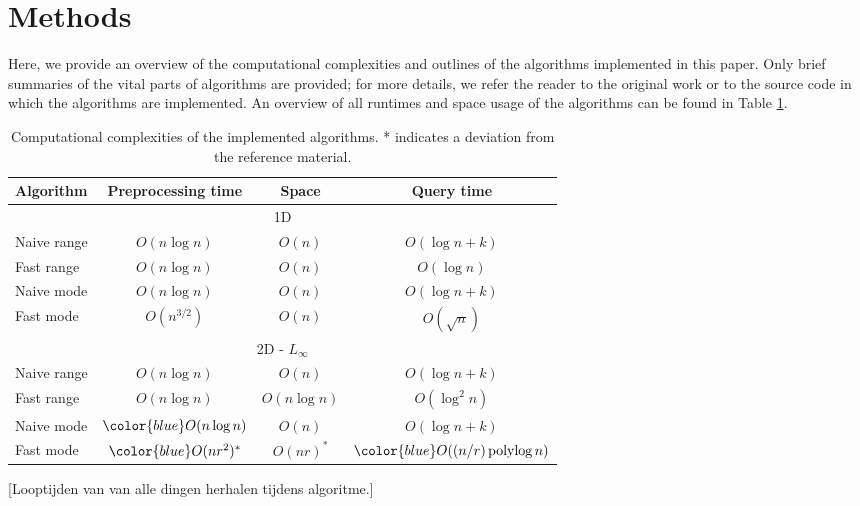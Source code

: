 \documentclass{article}
\newcommand{\todo}[1]{{\color{red}[#1]}}
\newcommand{\fb}[1]{{\color{blue}#1}}
\DeclareMathOperator{\polylog}{polylog}
\begin{document}
\section{Methods}
Here, we provide an overview of the computational complexities and outlines of
the algorithms implemented in this paper. Only brief summaries of the vital
parts of algorithms are provided; for more details, we refer the reader to the
original work or to the source code in which the algorithms are implemented. An
overview of all runtimes and space usage of the algorithms can be found in
Table \ref{tab:runtimes}.
\begin{table}[h]
    \centering
    \begin{tabular}{|l|ccc|}
        \hline
        Algorithm   & Preprocessing time & Space         & Query time                 \\
        \hline
        \hline
        \multicolumn{4}{|c|}{1D}                                                      \\
        \hline
        Naive range & $O(n \log n)$      & $O(n)$        & $O(\log n + k)$            \\
        Fast range  & $O(n \log n)$      & $O(n)$        & $O(\log n)$                \\
        Naive mode  & \fb{$O(n \log n)$} & \fb{$O(n)$}   & \fb{$O(\log n + k)$}       \\
        Fast mode   & $O(n^{3/2})$       & $O(n)$        & $O(\sqrt{n})$              \\
        \hline
        \multicolumn{4}{|c|}{2D - $L_\infty$}                                         \\
        \hline
        Naive range & $O(n \log n)$      & $O(n)$        & $O(\log n + k)$            \\
        Fast range  & $O(n \log n)$      & $O(n \log n)$ & $O(\log^2 n)$              \\
        Naive mode  & $\fb{O(n \log n)}$ & $O(n)$        & \fb{$O(\log n + k)$}       \\
        Fast mode   & $\fb{O(nr^2)^*}$   & $O(nr)^*$     & $\fb{O((n/r) \polylog n)}$ \\
        \hline
    \end{tabular}
    \caption{Computational complexities of the implemented algorithms. * indicates a deviation from the reference material.}
    \label{tab:runtimes}
\end{table}
\todo{Looptijden van van alle dingen herhalen tijdens algoritme.}\\
\end{document}
